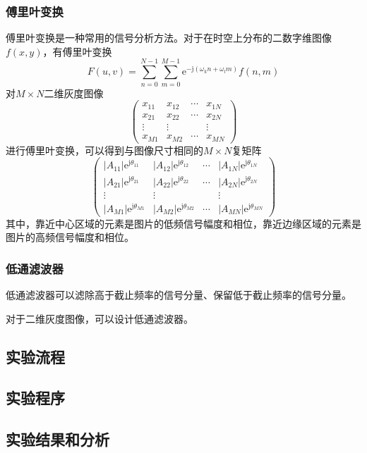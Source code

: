 \subsubsection{傅里叶变换}
傅里叶变换是一种常用的信号分析方法。对于在时空上分布的二数字维图像$f(x, y)$，有傅里叶变换
\[ F(u, v) = \sum_{n = 0}^{N - 1}\sum_{m = 0}^{M - 1}\mathrm{e}^{-\mathrm{j}(\omega_kn+\omega_lm)}f(n, m) \]
对$M\times N$二维灰度图像
\[\begin{pmatrix}
x_{11} & x_{12} & \cdots & x_{1N} \\
x_{21} & x_{22} & \cdots & x_{2N} \\
\vdots & \vdots && \vdots \\
x_{M1} & x_{M2} & \cdots & x_{MN}
\end{pmatrix} \]
进行傅里叶变换，可以得到与图像尺寸相同的$M\times N$复矩阵
\[ \begin{pmatrix}
|A_{11}|\mathrm{e}^{\mathrm{j}\theta_{11}} & |A_{12}|\mathrm{e}^{\mathrm{j}\theta_{12}} & \cdots & |A_{1N}|\mathrm{e}^{\mathrm{j}\theta_{1N}} \\
|A_{21}|\mathrm{e}^{\mathrm{j}\theta_{21}} & |A_{22}|\mathrm{e}^{\mathrm{j}\theta_{22}} & \cdots & |A_{2N}|\mathrm{e}^{\mathrm{j}\theta_{2N}} \\
\vdots & \vdots && \vdots \\
|A_{M1}|\mathrm{e}^{\mathrm{j}\theta_{M1}} & |A_{M2}|\mathrm{e}^{\mathrm{j}\theta_{M2}} & \cdots & |A_{MN}|\mathrm{e}^{\mathrm{j}\theta_{MN}}
\end{pmatrix} \]
其中，靠近中心区域的元素是图片的低频信号幅度和相位，靠近边缘区域的元素是图片的高频信号幅度和相位。
\subsubsection{低通滤波器}
低通滤波器可以滤除高于截止频率的信号分量、保留低于截止频率的信号分量。

对于二维灰度图像，可以设计低通滤波器。
\subsection{实验流程}
\subsection{实验程序}
\subsection{实验结果和分析}